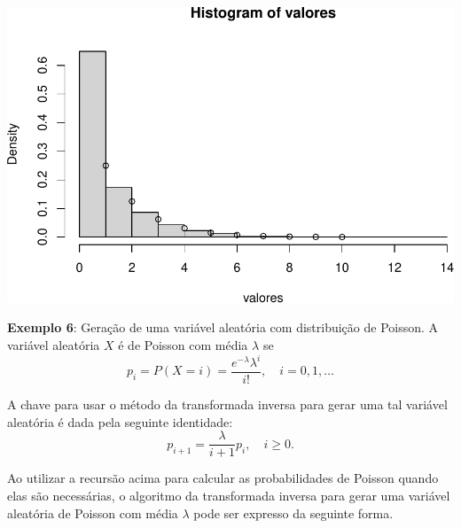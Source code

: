 \documentclass[
]{book}
\begin{document}
\includegraphics{introR_files/figure-latex/unnamed-chunk-280-1.pdf}

\textbf{Exemplo 6}: Geração de uma variável aleatória com distribuição de
Poisson. A variável aleatória \(X\) é de Poisson com média \(\lambda\) se
\[p_{i} = P(X = i) = \frac{e^{-\lambda}\lambda^i}{i!}, \quad i=0,1,\ldots\]

A chave para usar o método da transformada inversa para gerar uma tal
variável aleatória é dada pela seguinte identidade:
\[p_{i+1}=\frac{\lambda}{i+1}p_{i}, \quad i\geq 0.\]

Ao utilizar a recursão acima para calcular as probabilidades de Poisson
quando elas são necessárias, o algoritmo da transformada inversa para
gerar uma variável aleatória de Poisson com média \(\lambda\) pode ser
expresso da seguinte forma.
\end{document}
